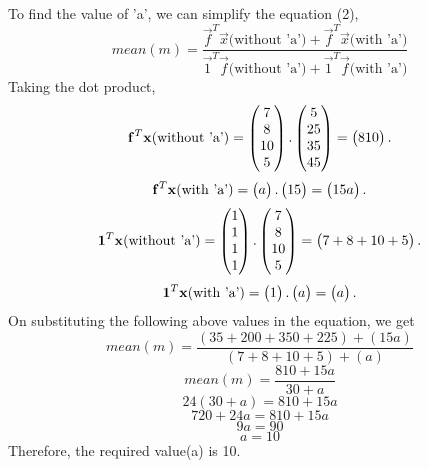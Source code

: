 \documentclass[journal,12pt,twocolumn]{IEEEtran}
\begin{document}
To find the value of 'a', we can simplify the equation (2),
\begin{equation*}
		mean(m) = \frac{\vec{f}^T\vec{x}\text{(without 'a')} + \vec{f}^T\vec{x}\text{(with 'a')}}{\vec{1}^T\vec{f}\text{(without 'a')} + \vec{1}^T\vec{f}\text{(with 'a')}}
\end{equation*}
Taking the dot product,\\
\begin{equation*}
	\mathbf{f}^T\mathbf{x}\text{(without 'a')} = \begin{pmatrix}7\\8\\10\\5\end{pmatrix}
		.\begin{pmatrix}5\\25\\35\\45\end{pmatrix}
		= \begin{pmatrix}810\end{pmatrix}.
\end{equation*}
\begin{equation*}
	\mathbf{f}^T\mathbf{x}\text{(with 'a')} = \begin{pmatrix}a\end{pmatrix}
	.\begin{pmatrix}15\end{pmatrix} = \begin{pmatrix}15a\end{pmatrix}.
\end{equation*}
\begin{equation*}
	\mathbf{1}^T\mathbf{x}\text{(without 'a')} = \begin{pmatrix}1\\1\\1\\1\end{pmatrix}.\begin{pmatrix}7\\8\\10\\5\end{pmatrix} = \begin{pmatrix}7 + 8 + 10 + 5\end{pmatrix}.
\end{equation*}
\begin{equation*}
	\mathbf{1}^T\mathbf{x}\text{(with 'a')} = \begin{pmatrix}1\end{pmatrix}.\begin{pmatrix}a\end{pmatrix} = \begin{pmatrix}a\end{pmatrix}.
\end{equation*}
On substituting the following above values in the equation, we get
\begin{equation*}
	mean(m) = \frac{(35 + 200 + 350 + 225) + (15a)}{(7 + 8 + 10 + 5) + (a)}
\end{equation*}
\begin{equation*}
	mean(m) = \frac{810 + 15a}{30 + a}
\end{equation*}
	\begin{equation*}
		24(30 + a) = 810 + 15a
	\end{equation*}
	\begin{equation*}
		720 + 24a = 810 + 15a
	\end{equation*}
	\begin{equation*}
		9a = 90
	\end{equation*}
	\begin{equation*}
		a = 10
	\end{equation*}
	Therefore, the required value(a) is 10.
\end{document}
